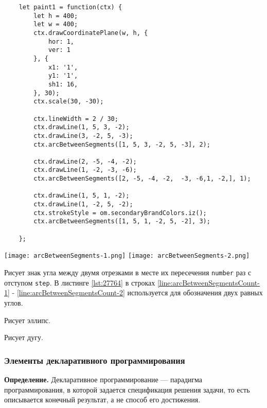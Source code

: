 \begin{lstlisting}
    let paint1 = function(ctx) {
        let h = 400;
        let w = 400;
        ctx.drawCoordinatePlane(w, h, {
            hor: 1,
            ver: 1
        }, {
            x1: '1',
            y1: '1',
            sh1: 16,
        }, 30);
        ctx.scale(30, -30);

        ctx.lineWidth = 2 / 30;
        ctx.drawLine(1, 5, 3, -2);
        ctx.drawLine(3, -2, 5, -3);
        ctx.arcBetweenSegments([1, 5, 3, -2, 5, -3], 2);

        ctx.drawLine(2, -5, -4, -2);
        ctx.drawLine(1, -2, -3, -6);
        ctx.arcBetweenSegments([2, -5, -4, -2,  -3, -6,1, -2,], 1);

        ctx.drawLine(1, 5, 1, -2);
		ctx.drawLine(1, -2, 5, -2);
		ctx.strokeStyle = om.secondaryBrandColors.iz();
		ctx.arcBetweenSegments([1, 5, 1, -2, 5, -2], 3);

    };
\end{lstlisting}

\texttt{[image: arcBetweenSegments-1.png]}    
\texttt{[image: arcBetweenSegments-2.png]}    

Рисует знак угла между двумя отрезками в месте их пересечения \texttt{number} раз с отступом \texttt{step}. В листинге \ref{lst:27764} в строках \ref{line:arcBetweenSegmentsCount-1} - \ref{line:arcBetweenSegmentsCount-2} используется для обозначения двух равных углов.

Рисует эллипс.

Рисует дугу.

\subsubsection{Элементы декларативного программирования}

\textbf{Определение.} Декларативное программирование — парадигма программирования, в которой задается спецификация решения задачи, то есть описывается конечный результат, а не способ его достижения.


